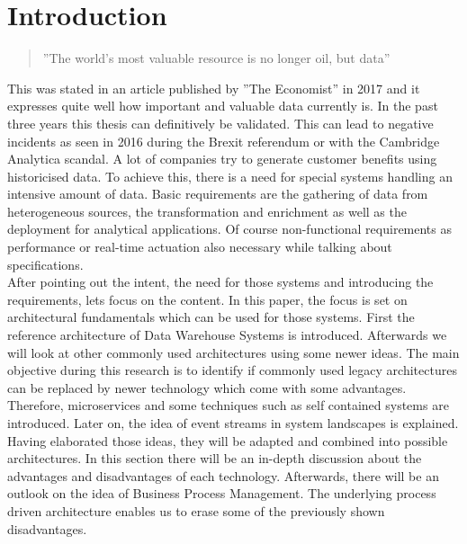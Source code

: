 \section{Introduction}
\label{sec:intro}
\begin{quote}
    ''The world’s most valuable resource is no longer oil, but data'' \cite{dataIsOil}
\end{quote}
This was stated in an article published by ''The Economist'' in 2017 and it expresses quite well how important and valuable data currently is. In the past three years this thesis can definitively be validated. This can lead to negative incidents as seen in 2016 during the Brexit referendum or with the Cambridge Analytica scandal. A lot of companies try to generate customer benefits using historicised data.\newline
To achieve this, there is a need for special systems handling an intensive amount of data. Basic requirements are the gathering of data from heterogeneous sources, the transformation and enrichment as well as the deployment for analytical applications. Of course non-functional requirements as performance or real-time actuation also necessary while talking about specifications.\newline
\\
After pointing out the intent, the need for those systems and introducing the requirements, lets focus on the content. In this paper, the focus is set on architectural fundamentals which can be used for those systems. First the reference architecture of Data Warehouse Systems is introduced. Afterwards we will look at other commonly used architectures using some newer ideas.
The main objective during this research is to identify if commonly used legacy architectures can be replaced by newer technology which come with some advantages.
\newline
Therefore, microservices and some techniques such as self contained systems are introduced. Later on, the idea of event streams in system landscapes is explained.\newline
Having elaborated those ideas, they will be adapted and combined into possible architectures. In this section there will be an in-depth discussion about the advantages and disadvantages of each technology.\newline
Afterwards, there will be an outlook on the idea of Business Process Management. The underlying process driven architecture enables us to erase some of the previously shown disadvantages.\newline
